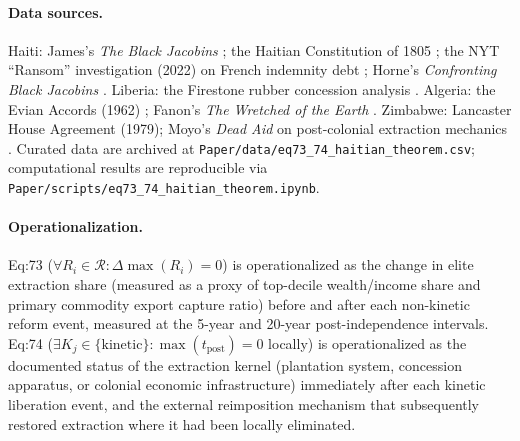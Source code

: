 \paragraph{Data sources.}
Haiti: James's \textit{The Black Jacobins} \cite{james_black_jacobins}; the Haitian Constitution of 1805 \cite{haiti_constitution_1805}; the NYT ``Ransom'' investigation (2022) on French indemnity debt \cite{nyt_ransom2022}; Horne's \textit{Confronting Black Jacobins} \cite{horne2015}. Liberia: the Firestone rubber concession analysis \cite{firestone_liberia}. Algeria: the Evian Accords (1962) \cite{evian_accords1962}; Fanon's \textit{The Wretched of the Earth} \cite{fanon1961}. Zimbabwe: Lancaster House Agreement (1979); Moyo's \textit{Dead Aid} on post-colonial extraction mechanics \cite{moyo2009}. Curated data are archived at \texttt{Paper/data/eq73\_74\_haitian\_theorem.csv}; computational results are reproducible via \texttt{Paper/scripts/eq73\_74\_haitian\_theorem.ipynb}.

\paragraph{Operationalization.}
Eq:73 ($\forall R_i \in \mathcal{R}: \Delta\max(R_i) = 0$) is operationalized as the change in elite extraction share (measured as a proxy of top-decile wealth/income share and primary commodity export capture ratio) before and after each non-kinetic reform event, measured at the 5-year and 20-year post-independence intervals. Eq:74 ($\exists K_j \in \{\text{kinetic}\}: \max(t_{\text{post}}) = 0$ locally) is operationalized as the documented status of the extraction kernel (plantation system, concession apparatus, or colonial economic infrastructure) immediately after each kinetic liberation event, and the external reimposition mechanism that subsequently restored extraction where it had been locally eliminated.

